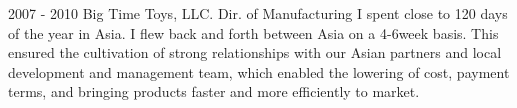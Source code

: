\vfill\null
\cvevent
{2007 - 2010}
{Big Time Toys, LLC.}
{Dir. of Manufacturing}
{I spent close to 120 days of the year in Asia. I flew back and forth between Asia on a 4-6week basis. This ensured the cultivation of strong relationships with our Asian partners and local development and management team, which enabled the lowering of cost, payment terms, and bringing products faster and more efficiently to market.}
{}
{}
{}